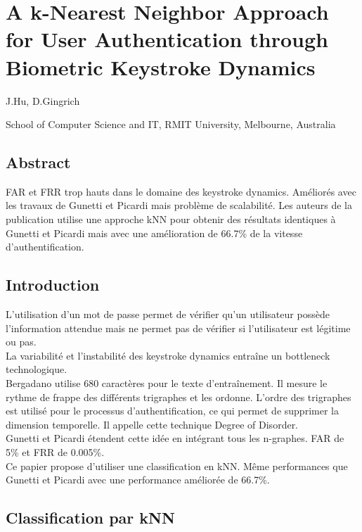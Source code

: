 \section{A k-Nearest Neighbor Approach for User Authentication through Biometric Keystroke Dynamics}

J.Hu, D.Gingrich

School of Computer Science and IT, RMIT University, Melbourne, Australia

\subsection{Abstract}

FAR et FRR trop hauts dans le domaine des keystroke dynamics. Améliorés avec les travaux de Gunetti et Picardi mais problème de scalabilité. Les auteurs de la publication utilise une approche kNN pour obtenir des résultats identiques à Gunetti et Picardi mais avec une amélioration de 66.7\% de la vitesse d'authentification.\\

\subsection{Introduction}

L'utilisation d'un mot de passe permet de vérifier qu'un utilisateur possède l'information attendue mais ne permet pas de vérifier si l'utilisateur est légitime ou pas.\\

La variabilité et l'instabilité des keystroke dynamics entraîne un bottleneck technologique.\\

Bergadano utilise 680 caractères pour le texte d'entraînement. Il mesure le rythme de frappe des différents trigraphes et les ordonne. L'ordre des trigraphes est utilisé pour le processus d'authentification, ce qui permet de supprimer la dimension temporelle. Il appelle cette technique Degree of Disorder.\\

Gunetti et Picardi étendent cette idée en intégrant tous les n-graphes. FAR de 5\% et FRR de 0.005\%.\\

Ce papier propose d'utiliser une classification en kNN. Même performances que Gunetti et Picardi avec une performance améliorée de 66.7\%.

\subsection{Classification par kNN}

